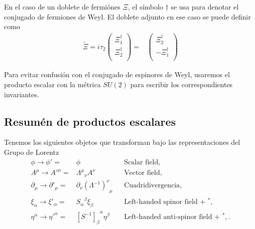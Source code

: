 En el caso de un doblete de fermiónes $\Xi$, el símbolo  $\dagger$ se usa para denotar el conjugado de fermiones de Weyl. El doblete adjunto en ese caso se puede definir como
\begin{align}
\label{eq:Xiadj}
 \widetilde{\Xi}=i\tau_2 \begin{pmatrix}
                  \Xi_1^{\dagger}\\
                  \Xi_2^{\dagger}\\
                \end{pmatrix}
=& \begin{pmatrix}
                  \Xi_2^{\dagger}\\
                 -\Xi_1^{\dagger}\\
                \end{pmatrix}
\end{align}

Para evitar confusión con el conjugado de espinores de Weyl, usaremos el producto escalar con la métrica $SU(2)$ para escribir los correspondientes invariantes.


\subsection{Resumén de productos escalares}

\begin{frame}
Tenemos los siguientes objetos que transforman bajo las representaciones del Grupo de Lorentz
\begin{align}
   \phi\to \phi'=&\phi && \text{Scalar field,}\nonumber\\
   A^\mu\to {A'}^\mu=&{\Lambda^\mu}_\nu A^\nu&&\text{Vector field,}\nonumber\\
  \partial_{\mu}\to \partial'_{\mu}=&\partial_{\nu} {\left( \Lambda^{-1} \right)^{\nu}}_{\mu}&&\text{Cuadridivergencia,}\nonumber\\
  \xi_\alpha\to\xi'_\alpha=&{S_\alpha}^\beta\xi_\beta
&& \text{Left-handed spinor field + ${}^{*}$,}\nonumber\\
\eta^{\alpha}\to {\eta'}^{\alpha} =&{\left[  S^{-1}  \right]_{\beta}}^{\alpha}\eta^\beta&&
 \text{Left-handed anti-spinor field + ${}^{*}$,}\,.
 \end{align}
\end{frame}



